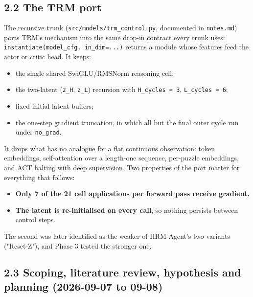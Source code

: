 \documentclass[11pt]{article}
\begin{document}
\subsection*{2.2 The TRM port}



The recursive trunk (\texttt{src/\allowbreak{}models/\allowbreak{}trm\_\allowbreak{}control.\allowbreak{}py}, documented in \texttt{notes.md}) ports TRM's mechanism into the same drop-in contract every trunk uses: \texttt{instantiate(model\_\allowbreak{}cfg,\allowbreak{} in\_\allowbreak{}dim=.\allowbreak{}.\allowbreak{}.\allowbreak{})} returns a module whose features feed the actor or critic head. It keeps:



\begin{itemize}
\item the single shared SwiGLU/RMSNorm reasoning cell;
\item the two-latent (\texttt{z\_H}, \texttt{z\_L}) recursion with \texttt{H\_cycles = 3}, \texttt{L\_cycles = 6};
\item fixed initial latent buffers;
\item the one-step gradient truncation, in which all but the final outer cycle run under \texttt{no\_grad}.
\end{itemize}



It drops what has no analogue for a flat continuous observation: token embeddings, self-attention over a length-one sequence, per-puzzle embeddings, and ACT halting with deep supervision. Two properties of the port matter for everything that follows:



\begin{itemize}
\item \textbf{Only 7 of the 21 cell applications per forward pass receive gradient.}
\item \textbf{The latent is re-initialised on every call}, so nothing persists between control steps.
\end{itemize}



The second was later identified as the weaker of HRM-Agent's two variants ("Reset-Z"), and Phase 3 tested the stronger one.



\subsection*{2.3 Scoping, literature review, hypothesis and planning (2026-09-07 to 09-08)}
\end{document}
